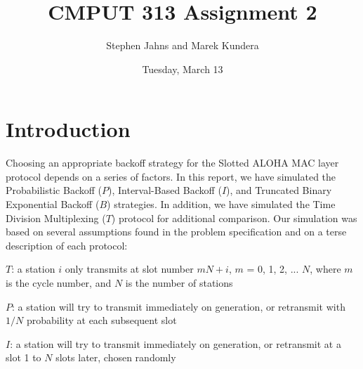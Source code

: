 \documentclass[twocolumn]{article}
\begin{document}
\lstset{
language=C,                             %
basicstyle=\ttfamily,                   %
numbers=left,                           %
numberstyle=\tiny,                      %
stepnumber=1,                           %
numbersep=5pt,                          %
frame=none,                             %
tabsize=2,                              %
captionpos=b,                           %
breaklines=true,                        %
breakatwhitespace=false,                %
showspaces=false,                       %
showtabs=false,                         %
columns=flexible                        %
}

\title{CMPUT 313 Assignment 2}
\date{Tuesday, March 13}
\author{Stephen Jahns and Marek Kundera}

\maketitle

\section*{Introduction}

	Choosing an appropriate backoff strategy for the Slotted ALOHA MAC layer protocol depends on a series of factors. In this report, we have simulated the Probabilistic Backoff ($P$), Interval-Based Backoff ($I$), and Truncated Binary Exponential Backoff ($B$) strategies. In addition, we have simulated the Time Division Multiplexing ($T$) protocol for additional comparison. Our simulation was based on several assumptions found in the problem specification and on a terse description of each protocol:

$T$: a station $i$ only transmits at slot number $mN + i$, $m$ = 0, 1, 2, ... $N$, where $m$ is the cycle number, and $N$ is the number of stations

$P$: a station will try to transmit immediately on generation, or retransmit with $1/N$ probability at each subsequent slot

$I$: a station will try to transmit immediately on generation, or retransmit at a slot 1 to $N$ slots later, chosen randomly
\end{document}
